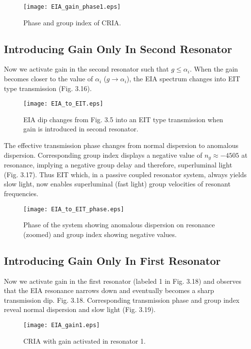 \begin{figure}[h]
\centering
\texttt{[image: EIA\_gain\_phase1.eps]}
\caption{Phase and group index of CRIA.}
\end{figure}
  
\subsection{Introducing Gain Only In Second Resonator}
Now we activate gain in the second resonator such that $g \leqslant \alpha_{i}$.  When the gain becomes closer to the value of $\alpha_{i}$ ($g \to \alpha_{i}$), the EIA spectrum changes into EIT type transmission (Fig. 3.16).

\begin{figure}[h]
\centering
\texttt{[image: EIA\_to\_EIT.eps]}
\caption{EIA dip changes from Fig. 3.5 into an EIT type transmission when gain is introduced in second resonator.}
\end{figure}

The effective transmission phase changes from normal dispersion to anomalous dispersion. Corresponding group index displays a negative value of $n_{g} \approx -4505$ at resonance, implying a negative group delay and therefore, superluminal light (Fig. 3.17). Thus EIT which, in a passive coupled resonator system, always yields slow light, now enables superluminal (fast light) group velocities of resonant frequencies.

\begin{figure}[h]
\centering
\texttt{[image: EIA\_to\_EIT\_phase.eps]}
\caption{Phase of the system showing anomalous dispersion on resonance (zoomed) and group index showing negative values.}
\end{figure}

\subsection{Introducing Gain Only In First Resonator}
Now we activate gain in the first resonator (labeled 1 in Fig. 3.18) and observes that the EIA resonance narrows down and eventually becomes a sharp transmission dip. Fig. 3.18. Corresponding transmission phase and group index reveal normal dispersion and slow light (Fig. 3.19).


\begin{figure}[h]
\centering
\texttt{[image: EIA\_gain1.eps]}
\caption{CRIA with gain activated in resonator 1.}
\end{figure}


